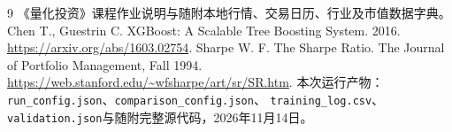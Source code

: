 \documentclass[UTF8,zihao=-4,fontset=fandol]{ctexart}
\newcommand{\ReportDate}{2026年11月14日}
\begin{document}
\begingroup\small
\begin{thebibliography}{9}
 《量化投资》课程作业说明与随附本地行情、交易日历、行业及市值数据字典。
 Chen T., Guestrin C. XGBoost: A Scalable Tree Boosting System. 2016.
\url{https://arxiv.org/abs/1603.02754}.
 Sharpe W. F. The Sharpe Ratio. The Journal of Portfolio Management, Fall 1994.
\url{https://web.stanford.edu/~wfsharpe/art/sr/SR.htm}.
 本次运行产物：\texttt{run\_config.json}、\texttt{comparison\_config.json}、
\texttt{training\_log.csv}、\texttt{validation.json}与随附完整源代码，\ReportDate。
\end{thebibliography}
\endgroup


\end{document}
